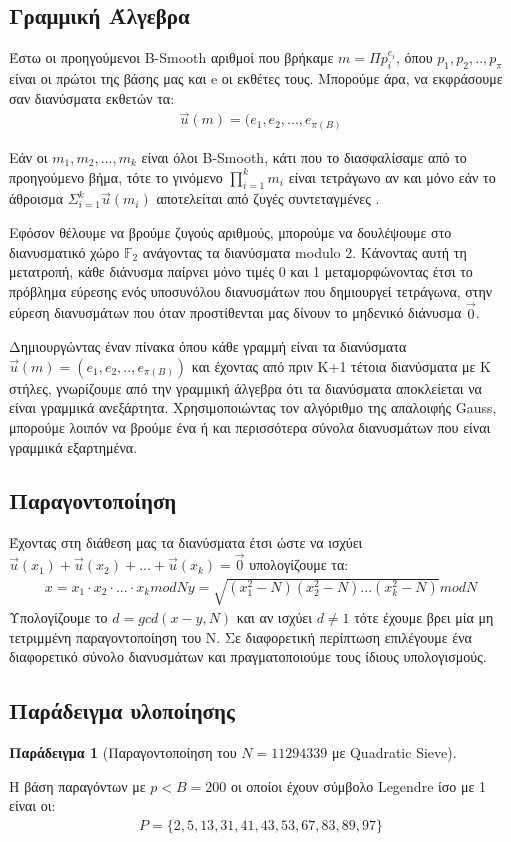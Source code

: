 \documentclass[12pt]{article}
\newtheorem{example}{Παράδειγμα}[section]
\numberwithin{equation}{section}
\begin{document}
\subsection{Γραμμική Άλγεβρα}
Έστω οι προηγούμενοι B-Smooth αριθμοί που βρήκαμε $m=\Pi p_i ^{e_i}$, όπου $p_1,p_2,..,p_π$ είναι οι πρώτοι της βάσης μας και e οι εκθέτες τους. Μπορούμε άρα, να εκφράσουμε σαν διανύσματα εκθετών τα:
\begin{align}
    \vec{u}(m) = (e_1,e_2,...,e_{π(B)} \nonumber
\end{align}

Εάν οι $m_1,m_2,...,m_k$ είναι όλοι B-Smooth, κάτι που το διασφαλίσαμε από το προηγούμενο βήμα, τότε το γινόμενο $\prod_{i=1}^{k}m_i$ είναι τετράγωνο αν και μόνο εάν το άθροισμα $\Sigma_{i=1}^{k} \vec{u}(m_i) $ αποτελείται από ζυγές συντεταγμένες \cite{crandall_prime_numbers}.

Εφόσον θέλουμε να βρούμε ζυγούς αριθμούς, μπορούμε να δουλέψουμε στο διανυσματικό χώρο $\mathbb{F}_2$ ανάγοντας τα διανύσματα modulo 2. Κάνοντας αυτή τη μετατροπή, κάθε διάνυσμα παίρνει μόνο τιμές 0 και 1 μεταμορφώνοντας έτσι το πρόβλημα εύρεσης ενός υποσυνόλου διανυσμάτων που δημιουργεί τετράγωνα, στην εύρεση διανυσμάτων που όταν προστίθενται μας δίνουν το μηδενικό διάνυσμα $\vec{0}$.

Δημιουργώντας έναν πίνακα όπου κάθε γραμμή είναι τα διανύσματα $\vec{u}(m)=(e_1,e_2,..,e_{π(B)})$ και έχοντας από πριν Κ+1 τέτοια διανύσματα με Κ στήλες, γνωρίζουμε από την γραμμική άλγεβρα ότι τα διανύσματα αποκλείεται να είναι γραμμικά ανεξάρτητα. Χρησιμοποιώντας τον αλγόριθμο της απαλοιφής Gauss, μπορούμε λοιπόν να βρούμε ένα ή και περισσότερα σύνολα διανυσμάτων που είναι γραμμικά εξαρτημένα.

\subsection{Παραγοντοποίηση}
Έχοντας στη διάθεση μας τα διανύσματα έτσι ώστε να ισχύει $\vec{u}(x_1)+\vec{u}(x_2)+...+\vec{u}(x_k)=\vec{0}$ υπολογίζουμε τα:
\begin{align}
    x = x_1 \cdot x_2 \cdot ... \cdot x_k mod N \nonumber
    y = \sqrt{(x_1^2-N)(x_2^2-N)...(x_k^2-N)} mod N
\end{align}
Υπολογίζουμε το $d=gcd(x-y,N)$ και αν ισχύει $d \neq 1$ τότε έχουμε βρει μία μη τετριμμένη παραγοντοποίηση του Ν. Σε διαφορετική περίπτωση επιλέγουμε ένα διαφορετικό σύνολο διανυσμάτων και πραγματοποιούμε τους ίδιους υπολογισμούς.

\subsection{Παράδειγμα υλοποίησης}
\begin{example}[Παραγοντοποίηση του $Ν=11294339$ με Quadratic Sieve] 
\end{example}
    Η βάση παραγόντων με $p<B=200$ οι οποίοι έχουν σύμβολο Legendre ίσο με 1 είναι οι:
    \begin{align}
        P = \{2, 5, 13, 31, 41, 43, 53, 67, 83, 89, 97\} \nonumber
    \end{align}
\end{document}
